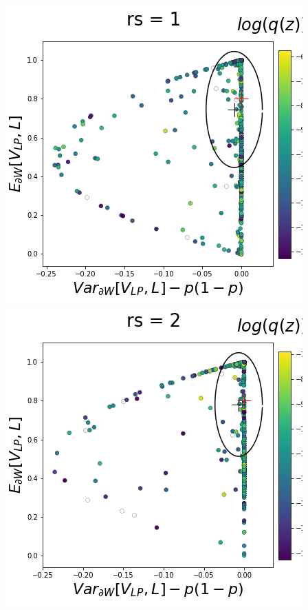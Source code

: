 \documentclass[11pt]{article}
\begin{document}
\begin{center}
\includegraphics[scale=0.33]{figs/T_x_SC_pvar_full_c=0_p=80_rs=1.png}
\includegraphics[scale=0.33]{figs/T_x_SC_pvar_full_c=0_p=80_rs=2.png}

\end{center}
\end{document}
